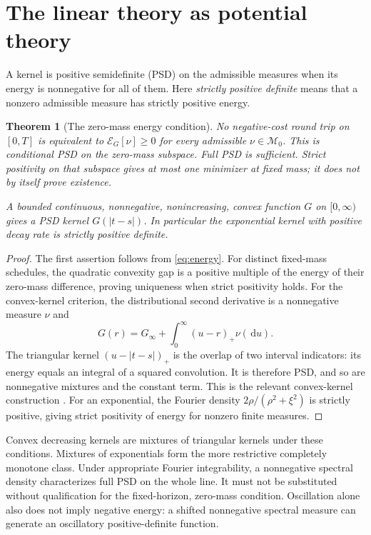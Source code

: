 \documentclass[11pt]{article}
\numberwithin{equation}{section}
\newtheorem{theorem}{Theorem}[section]
\theoremstyle{definition}
\theoremstyle{remark}
\theoremstyle{definition}
\newcommand{\dd}{\,\mathrm d}
\begin{document}
\section{The linear theory as potential theory}\label{sec:linear}
A kernel is positive semidefinite (PSD) on the admissible measures when its energy
is nonnegative for all of them. Here \emph{strictly positive definite} means that
a nonzero admissible measure has strictly positive energy.

\begin{theorem}[The zero-mass energy condition]\label{thm:psd}
No negative-cost round trip on $[0,T]$ is equivalent to
$\mathcal E_G[\nu]\geq0$ for every admissible $\nu\in\mathcal M_0$.
This is conditional PSD on the zero-mass subspace. Full PSD is sufficient.
Strict positivity on that subspace gives at most one minimizer at fixed mass;
it does not by itself prove existence.

A bounded continuous, nonnegative, nonincreasing, convex function $G$ on
$[0,\infty)$ gives a PSD kernel $G(|t-s|)$. In particular the exponential
kernel with positive decay rate is strictly positive definite.
\end{theorem}
\begin{proof}
The first assertion follows from \eqref{eq:energy}. For distinct fixed-mass
schedules, the quadratic convexity gap is a positive multiple of the energy
of their zero-mass difference, proving uniqueness when strict positivity holds.
For the convex-kernel criterion, the distributional second derivative is a
nonnegative measure $\nu$ and
\[
 G(r)=G_\infty+\int_0^\infty(u-r)_+\nu(\dd u).
\]
The triangular kernel $(u-|t-s|)_+$ is the overlap of two interval indicators:
its energy equals an integral of a squared convolution. It is therefore PSD,
and so are nonnegative mixtures and the constant term. This is the relevant
convex-kernel construction \citep{alfonsischiedslynko2012}.
For an exponential, the Fourier density
$2\rho/(\rho^2+\xi^2)$ is strictly positive, giving strict positivity of energy
for nonzero finite measures.
\end{proof}

Convex decreasing kernels are mixtures of triangular kernels under these
conditions. Mixtures of exponentials form the more restrictive completely
monotone class. Under appropriate Fourier integrability, a nonnegative spectral
density characterizes full PSD on the whole line. It must not be substituted
without qualification for the fixed-horizon, zero-mass condition. Oscillation
alone also does not imply negative energy: a shifted nonnegative spectral
measure can generate an oscillatory positive-definite function.
\end{document}
